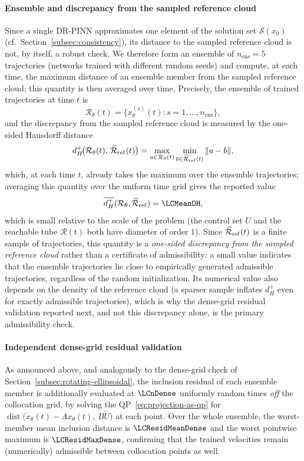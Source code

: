 \documentclass[11pt]{elsarticle}
\theoremstyle{definition}
\theoremstyle{remark}
\numberwithin{equation}{section}
\def\dist{\operatorname{dist}}
\begin{document}
\paragraph{Ensemble and discrepancy from the sampled reference cloud}
Since a single DR-PINN approximates one element of the solution set
$\mathcal{S}(x_0)$ (cf.\ Section~\ref{subsec:consistency}), its distance to
the sampled reference cloud is not, by itself, a robust check. We therefore
form an ensemble of $n_{\mathrm{ens}} = 5$ trajectories (networks trained
with different random seeds) and compute, at each time, the maximum
distance of an ensemble member from the sampled reference cloud; this
quantity is then averaged over time. Precisely, the ensemble of trained
trajectories at time $t$ is
\[
  \mathcal{R}_\theta(t) = \bigl\{x_\theta^{(s)}(t) : s = 1,\dots,n_{\mathrm{ens}}\bigr\},
\]
and the discrepancy from the sampled reference cloud is measured by the
one-sided Hausdorff distance
\[
  d_H^+\!\bigl(\mathcal{R}_\theta(t),\,\widehat{\mathcal{R}}_{\rm ref}(t)\bigr)
  = \max_{a \in \mathcal{R}_\theta(t)}\min_{b \in \widehat{\mathcal{R}}_{\rm ref}(t)}\|a-b\|,
\]
which, at each time $t$, already takes the maximum over the ensemble
trajectories; averaging this quantity over the uniform time grid gives the
reported value
\[
  \overline{d_H^+}(\mathcal{R}_\theta,\widehat{\mathcal{R}}_{\rm ref}) = \LCMeanDH,
\]
which is small relative to the scale of the problem (the control set $U$ and
the reachable tube $\mathcal{R}(t)$ both have diameter of order $1$).
Since $\widehat{\mathcal{R}}_{\rm ref}(t)$ is a finite sample of
trajectories, this quantity is a \emph{one-sided discrepancy from the
sampled reference cloud} rather than a certificate of admissibility: a small
value indicates that the ensemble trajectories lie close to empirically
generated admissible trajectories, regardless of the random initialization.
Its numerical value also depends on the density of the reference cloud
(a sparser sample inflates $d_H^+$ even for exactly admissible
trajectories), which is why the dense-grid residual validation reported
next, and not this discrepancy alone, is the primary admissibility check.

\paragraph{Independent dense-grid residual validation}
As announced above, and analogously to the dense-grid check of
Section~\ref{subsec:rotating-ellipsoidal}, the inclusion residual of each
ensemble member is additionally evaluated at $\LCnDense$ uniformly random
times \emph{off} the collocation grid, by solving the
QP~\eqref{eq:projection-as-qp} for
$\dist\!\bigl(\dot x_\theta(t)-Ax_\theta(t),\,B\widetilde U\bigr)$ at each
point. Over the whole ensemble, the worst-member mean inclusion distance is
$\LCResidMeanDense$ and the worst pointwise maximum is
$\LCResidMaxDense$, confirming that the trained velocities remain
(numerically) admissible between collocation points as well.
\end{document}

